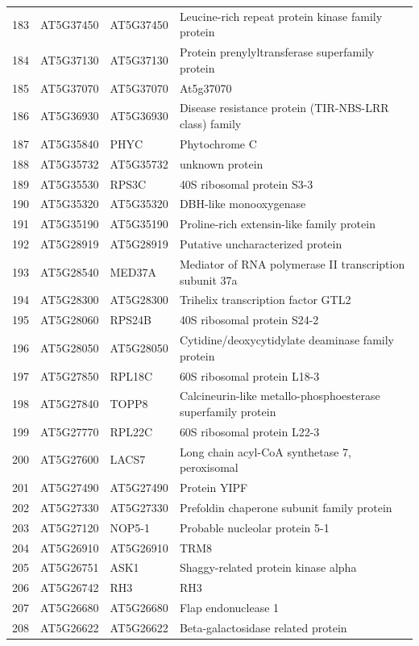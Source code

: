 \documentclass[11pt]{article}
\begin{document}
\begin{center}
\begin{tabular}{rlll}
183 & AT5G37450 & AT5G37450 & Leucine-rich repeat protein kinase family protein\\
184 & AT5G37130 & AT5G37130 & Protein prenylyltransferase superfamily protein\\
185 & AT5G37070 & AT5G37070 & At5g37070\\
186 & AT5G36930 & AT5G36930 & Disease resistance protein (TIR-NBS-LRR class) family\\
187 & AT5G35840 & PHYC & Phytochrome C\\
188 & AT5G35732 & AT5G35732 & unknown protein\\
189 & AT5G35530 & RPS3C & 40S ribosomal protein S3-3\\
190 & AT5G35320 & AT5G35320 & DBH-like monooxygenase\\
191 & AT5G35190 & AT5G35190 & Proline-rich extensin-like family protein\\
192 & AT5G28919 & AT5G28919 & Putative uncharacterized protein\\
193 & AT5G28540 & MED37A & Mediator of RNA polymerase II transcription subunit 37a\\
194 & AT5G28300 & AT5G28300 & Trihelix transcription factor GTL2\\
195 & AT5G28060 & RPS24B & 40S ribosomal protein S24-2\\
196 & AT5G28050 & AT5G28050 & Cytidine/deoxycytidylate deaminase family protein\\
197 & AT5G27850 & RPL18C & 60S ribosomal protein L18-3\\
198 & AT5G27840 & TOPP8 & Calcineurin-like metallo-phosphoesterase superfamily protein\\
199 & AT5G27770 & RPL22C & 60S ribosomal protein L22-3\\
200 & AT5G27600 & LACS7 & Long chain acyl-CoA synthetase 7, peroxisomal\\
201 & AT5G27490 & AT5G27490 & Protein YIPF\\
202 & AT5G27330 & AT5G27330 & Prefoldin chaperone subunit family protein\\
203 & AT5G27120 & NOP5-1 & Probable nucleolar protein 5-1\\
204 & AT5G26910 & AT5G26910 & TRM8\\
205 & AT5G26751 & ASK1 & Shaggy-related protein kinase alpha\\
206 & AT5G26742 & RH3 & RH3\\
207 & AT5G26680 & AT5G26680 & Flap endonuclease 1\\
208 & AT5G26622 & AT5G26622 & Beta-galactosidase related protein\\

\end{tabular}
\end{center}
\end{document}
